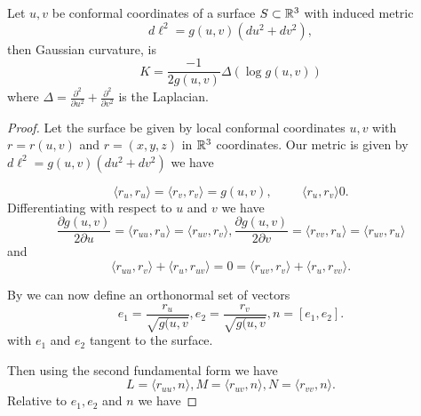 \begin{theorem}\label{thm:log-curve}
	Let $u,v$ be conformal coordinates of a surface $S\subset \mathbb{R}^3$ with
	induced metric 
	$$d\ell^2=g(u,v)(du^2+dv^2),$$
	then Gaussian curvature,  is 
		\begin{equation}\label{eqn:log-curve}
			K=\frac{-1}{2g(u,v)}\Delta(\log g(u,v))
		\end{equation}
		where $\Delta=\frac{\partial^2}{\partial u^2}+\frac{\partial^2}{\partial v^2}$
		is the Laplacian.
\end{theorem}
\begin{proof}
	Let the surface be given by local conformal coordinates $u,v$
	with $r=r(u,v)$ and $r=(x,y,z)$ in $\mathbb{R}^3$ coordinates.
	Our metric is given by $d\ell^2=g(u,v)(du^2+dv^2)$
	we have 
	
	\begin{equation}\label{eqn:log-curve-proof-inners}
		\langle r_u,r_u\rangle = \langle r_v,r_v\rangle=g(u,v), \hspace{1cm} \langle r_u,r_v\rangle 0.
	\end{equation}
	Differentiating with respect to $u$ and $v$ we have
	\begin{equation}\label{eqn:log-curve-proof-firsts}
		\frac{ \partial g(u,v)}{2\partial u}=\langle r_{uu}, r_u\rangle =\langle r_{uv}, r_v\rangle,
		\frac{ \partial g(u,v)}{2\partial v}=\langle r_{vv}, r_u\rangle =\langle r_{uv}, r_u\rangle
		\end{equation}
		and
		\begin{equation}\label{eqn:log-curve-proof-firsts-1}
		\langle r_{uu},r_v\rangle + \langle r_u, r_{uv}\rangle=0=\langle r_{uv},r_v\rangle + \langle r_u, r_{vv}\rangle.
		\end{equation}
	
	
	By  we can now define an orthonormal set of vectors
	\begin{equation}\label{eqn:log-curve-proof-orthog}
		e_1=\frac{r_u}{\sqrt{g(u,v}}, e_2=\frac{r_v}{\sqrt{g(u,v}}, n=[e_1,e_2].
	\end{equation}
	with $e_1$ and $e_2$ tangent to the surface.
	
	Then using the second fundamental form we have
	$$L=\langle r_{uu},n\rangle , M=\langle r_{uv},n\rangle, N=\langle r_{vv},n\rangle.$$
	Relative to $e_1, e_2$ and $n$ we have
	

\end{proof}
